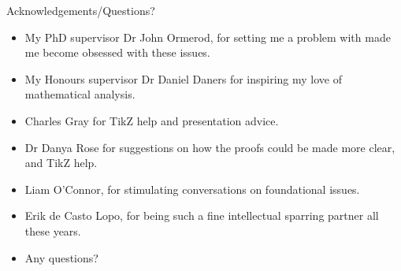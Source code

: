 \documentclass{beamer}
\begin{document}

\begin{frame}{Acknowledgements/Questions?}
\begin{itemize}
\item My PhD supervisor Dr John Ormerod, for setting me a problem with made me become obsessed with these
			issues.
\item My Honours supervisor Dr Daniel Daners for inspiring my love of mathematical analysis.
\item Charles Gray for TikZ help and presentation advice.
\item Dr Danya Rose for suggestions on how the proofs could be made more clear, and TikZ help.
\item Liam O'Connor, for stimulating conversations on foundational issues.
\item Erik de Casto Lopo, for being such a fine intellectual sparring partner all these years.
\item Any questions?
\end{itemize}
\end{frame}
\end{document}
